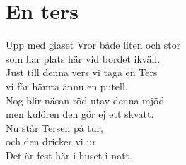 \section{En ters}
Upp med glaset Vror både liten och stor\\
som har plats här vid bordet ikväll.\\
Just till denna vers vi taga en Ters\\
vi får hämta ännu en putell.\\
Nog blir näsan röd utav denna mjöd\\
men kulören den gör ej ett skvatt.\\
Nu står Tersen på tur,\\
och den dricker vi ur\\
Det är fest här i huset i natt.\\